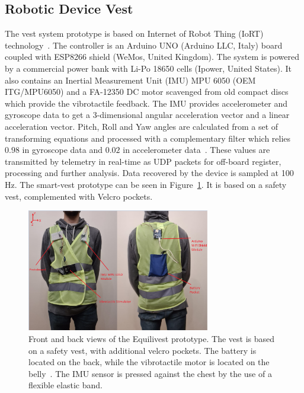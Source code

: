 \documentclass[conference]{IEEEtran}
\begin{document}

%

\subsection{Robotic Device Vest}
\label{sec:vest}

The vest system prototype is based on Internet of Robot Thing (IoRT) technology~\cite{Simoens.etal2018,Domingo.etal2012}. The controller is an Arduino UNO (Arduino LLC, Italy) board coupled with ESP8266 shield (WeMos, United Kingdom).  The system is powered by a commercial power bank with Li-Po 18650 cells (Ipower, United States). It also contains an Inertial Measurement Unit (IMU) MPU 6050 (OEM ITG/MPU6050) and a FA-12350 DC motor scavenged from old compact discs which provide the vibrotactile feedback.  The IMU provides accelerometer and gyroscope data to get a 3-dimensional angular acceleration vector and a linear acceleration vector. Pitch, Roll and Yaw angles are calculated from a set of transforming equations and processed with a complementary filter which relies $0.98$ in gyroscope data and $0.02$ in accelerometer data~\cite{Fetick.2022}. These values are transmitted by telemetry in real-time as UDP packets for off-board register, processing and further analysis. Data recovered by the device is sampled at 100 Hz. The smart-vest prototype can be seen in Figure~\ref{fig:smart-vest}.  It is based on a safety vest, complemented with Velcro pockets. 

\begin{figure}[h!]
\centering
\includegraphics[width=8cm]{equilivest.png}
\caption{Front and back views of the Equilivest prototype.  The vest is based on a safety vest, with additional velcro pockets.  The battery is located on the back, while the vibrotactile motor is located on the belly~\cite{Brandebusemeyer.etal2021}.  The IMU sensor is pressed against the chest by the use of a flexible elastic band. }
\label{fig:smart-vest}
\end{figure}
\end{document}
